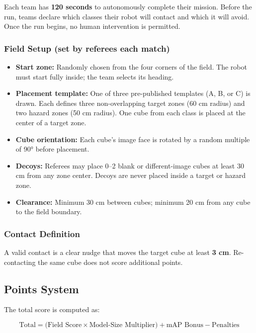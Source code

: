 \documentclass[11pt,a4paper]{article}
\begin{document}
Each team has \textbf{120 seconds} to autonomously complete their mission. Before the run, teams declare which classes their robot will contact and which it will avoid. Once the run begins, no human intervention is permitted.

\subsubsection*{Field Setup (set by referees each match)}

\begin{itemize}
    \item \textbf{Start zone:} Randomly chosen from the four corners of the field. The robot must start fully inside; the team selects its heading.
    \item \textbf{Placement template:} One of three pre-published templates (A, B, or C) is drawn. Each defines three non-overlapping target zones (60 cm radius) and two hazard zones (50 cm radius). One cube from each class is placed at the center of a target zone.
    \item \textbf{Cube orientation:} Each cube's image face is rotated by a random multiple of 90° before placement.
    \item \textbf{Decoys:} Referees may place 0--2 blank or different-image cubes at least 30 cm from any zone center. Decoys are never placed inside a target or hazard zone.
    \item \textbf{Clearance:} Minimum 30 cm between cubes; minimum 20 cm from any cube to the field boundary.
\end{itemize}

\subsubsection*{Contact Definition}

A valid contact is a clear nudge that moves the target cube at least \textbf{3 cm}. Re-contacting the same cube does not score additional points.

\subsection{Points System}

The total score is computed as:

\begin{equation}
    \text{Total} = \bigl(\text{Field Score} \times \text{Model-Size Multiplier}\bigr) + \text{mAP Bonus} - \text{Penalties}
\end{equation}
\end{document}
